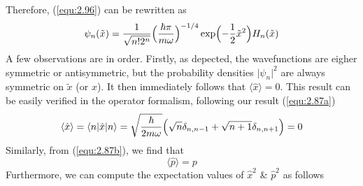 Therefore, (\ref{equ:2.96}) can be rewritten as
\begin{equation}
  \psi_n(\tilde{x}) = \frac{1}{\sqrt{n!2^n}}
  \Bigl(
    \frac{\hbar \pi}{m\omega}
    \Bigr)^{-1/4}
    \exp\Bigl(-\frac{1}{2}\tilde{x}^2\Bigr)
    H_n(\tilde{x})
  \label{equ:2.98}
\end{equation}
A few observations are in order. Firstly, as depected, the
wavefunctions are eigher symmetric or antisymmetric, but the
probability densities $\vert \psi_n\vert ^2$ are always symmetric on
$\tilde{x}$ (or $x$). It then immediately follows that
$\langle \hat{x}\rangle  = 0$. This result can be easily verified in the
operator formalism, following our result (\ref{equ:2.87a})
\begin{equation}
  \langle \hat{x}\rangle  = \langle n\vert \hat{x}\vert n\rangle  = \sqrt{\frac{\hbar}{2m\omega}}
  \Bigl(
  \sqrt{n}\delta_{n, n-1} + \sqrt{n+1}\delta_{n, n+1}
  \Bigr)
  = 0
  \label{equ:2.99}
\end{equation}
Similarly, from (\ref{equ:2.87b}), we find that
\begin{equation}
  \langle \hat{p}\rangle  = p
  \label{equ:2.100}
\end{equation}
Furthermore, we can compute the expectation values of
$\hat{x}^2$ \& $\hat{p}^2$ as follows

